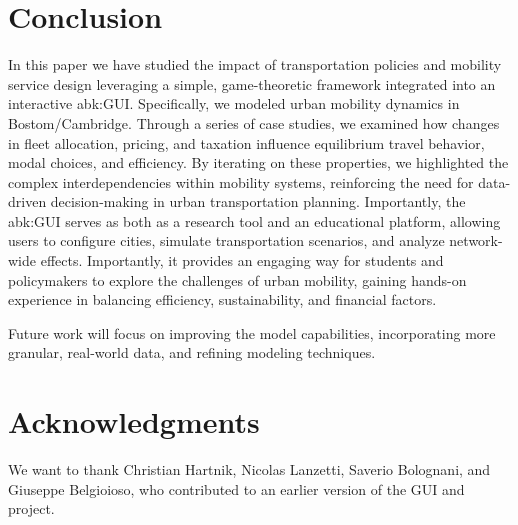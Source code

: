 \section{Conclusion}\label{sec:conclusion}
In this paper we have studied the impact of transportation policies and mobility service design leveraging a simple, game-theoretic framework integrated into an interactive \gls{abk:GUI}.
Specifically, we modeled urban mobility dynamics in Bostom/Cambridge.
Through a series of case studies, we examined how changes in fleet allocation, pricing, and taxation influence equilibrium travel behavior, modal choices, and efficiency.
By iterating on these properties, we highlighted the complex interdependencies within mobility systems, reinforcing the need for data-driven decision-making in urban transportation planning. 
Importantly, the \gls{abk:GUI} serves as both as a research tool and an educational platform, allowing users to configure cities, simulate transportation scenarios, and analyze network-wide effects.
Importantly, it provides an engaging way for students and policymakers to explore the challenges of urban mobility, gaining hands-on experience in balancing efficiency, sustainability, and financial factors.

Future work will focus on improving the model capabilities, incorporating more granular, real-world data, and refining modeling techniques. 
%
\section{Acknowledgments}
We want to thank Christian Hartnik, Nicolas Lanzetti, Saverio Bolognani, and Giuseppe Belgioioso, who contributed to an earlier version of the GUI and project.